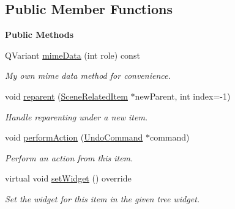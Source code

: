 \subsection*{Public Member Functions}
\begin{Indent}\textbf{ Public Methods}\par
\begin{DoxyCompactItemize}
\item 
\mbox{\label{classrev_1_1_view_1_1_scene_related_item_a700d89bb507d8fb2aefa59de63154d1e}} 
Q\+Variant \mbox{\hyperlink{classrev_1_1_view_1_1_scene_related_item_a700d89bb507d8fb2aefa59de63154d1e}{mime\+Data}} (int role) const
\begin{DoxyCompactList}\small\item\em My own mime data method for convenience. \end{DoxyCompactList}\item 
\mbox{\label{classrev_1_1_view_1_1_scene_related_item_ab1201ff42b32313c00bf09bb9b6e5f59}} 
void \mbox{\hyperlink{classrev_1_1_view_1_1_scene_related_item_ab1201ff42b32313c00bf09bb9b6e5f59}{reparent}} (\mbox{\hyperlink{classrev_1_1_view_1_1_scene_related_item}{Scene\+Related\+Item}} $\ast$new\+Parent, int index=-\/1)
\begin{DoxyCompactList}\small\item\em Handle reparenting under a new item. \end{DoxyCompactList}\item 
\mbox{\label{classrev_1_1_view_1_1_scene_related_item_ad8c8fae7f99804c954530416aa44699b}} 
void \mbox{\hyperlink{classrev_1_1_view_1_1_scene_related_item_ad8c8fae7f99804c954530416aa44699b}{perform\+Action}} (\mbox{\hyperlink{classrev_1_1_undo_command}{Undo\+Command}} $\ast$command)
\begin{DoxyCompactList}\small\item\em Perform an action from this item. \end{DoxyCompactList}\item 
virtual void \mbox{\hyperlink{classrev_1_1_view_1_1_scene_related_item_a95e05efcaa12dd3deb2cabd7c3bdd343}{set\+Widget}} () override
\begin{DoxyCompactList}\small\item\em Set the widget for this item in the given tree widget. \end{DoxyCompactList}\item 

\end{DoxyCompactItemize}
\end{Indent}
